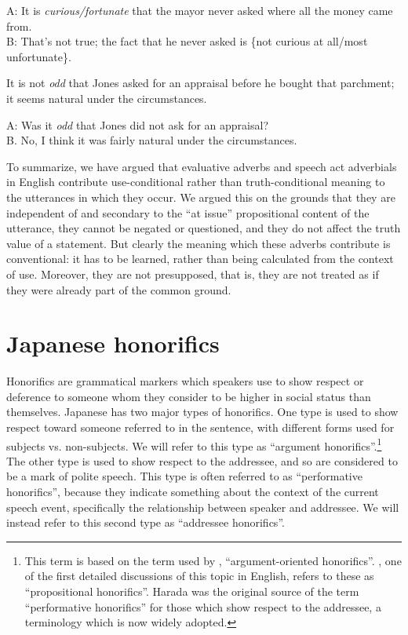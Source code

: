 \ea
A: It is \textit{curious/fortunate} that the mayor never asked where all the money came from.\\
B: That’s not true; the fact that he never asked is \{not curious at all/most unfortunate\}.
\z

\ea
It is not \textit{odd} that Jones asked for an appraisal before he bought that parchment;\\
  it seems natural under the circumstances.
\z

\ea
A: Was it \textit{odd} that Jones did not ask for an appraisal?\\
B. No, I think it was fairly natural under the circumstances.
\z


To summarize, we have argued that evaluative adverbs and speech act adverbials in English contribute use-conditional rather than truth-conditional meaning to the utterances in which they occur. We argued this on the grounds that they are independent of and secondary to the “at issue” propositional content of the utterance, they cannot be negated or questioned, and they do not affect the truth value of a statement. But clearly the meaning which these adverbs contribute is conventional: it has to be learned, rather than being calculated from the context of use. Moreover, they are not presupposed, that is, they are not treated as if they were already part of the common ground.


\section{Japanese honorifics}\label{sec:} %

Honorifics are grammatical markers which speakers use to show respect or deference to someone whom they consider to be higher in social status than themselves. Japanese has two major types of honorifics. One type is used to show respect toward someone referred to in the sentence, with different forms used for subjects vs. non-subjects. We will refer to this type as “argument honorifics”.\footnote{This term is based on the term used by \citet{Potts2005}, “argument-oriented honorifics”. \citet{Harada1976}, one of the first detailed discussions of this topic in English, refers to these as “propositional honorifics”. Harada was the original source of the term “performative honorifics” for those which show respect to the addressee, a terminology which is now widely adopted.} The other type is used to show respect to the addressee, and so are considered to be a mark of polite speech. This type is often referred to as “performative honorifics”, because they indicate something about the context of the current speech event, specifically the relationship between speaker and addressee. We will instead refer to this second type as “addressee honorifics”.



